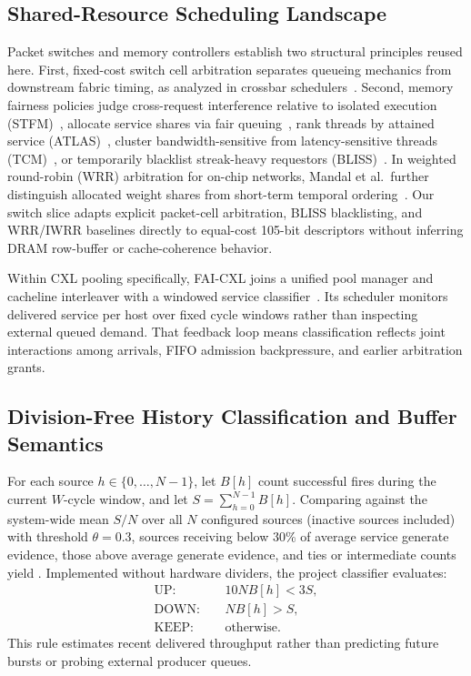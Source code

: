 \subsection{Shared-Resource Scheduling Landscape}
Packet switches and memory controllers establish two structural principles reused here. First, fixed-cost switch cell arbitration separates queueing mechanics from downstream fabric timing, as analyzed in crossbar schedulers~\cite{gupta}. Second, memory fairness policies judge cross-request interference relative to isolated execution (STFM)~\cite{stfm}, allocate service shares via fair queuing~\cite{fqmem}, rank threads by attained service (ATLAS)~\cite{atlas}, cluster bandwidth-sensitive from latency-sensitive threads (TCM)~\cite{tcm}, or temporarily blacklist streak-heavy requestors (BLISS)~\cite{bliss}. In weighted round-robin (WRR) arbitration for on-chip networks, Mandal et al.\ further distinguish allocated weight shares from short-term temporal ordering~\cite{wrr_mandal}. Our switch slice adapts explicit packet-cell arbitration, BLISS blacklisting, and WRR/IWRR baselines directly to equal-cost 105-bit descriptors without inferring DRAM row-buffer or cache-coherence behavior.

Within CXL pooling specifically, FAI-CXL joins a unified pool manager and cacheline interleaver with a windowed service classifier~\cite{fai}. Its scheduler monitors delivered service per host over fixed cycle windows rather than inspecting external queued demand. That feedback loop means classification reflects joint interactions among arrivals, FIFO admission backpressure, and earlier arbitration grants.

\subsection{Division-Free History Classification and Buffer Semantics}
For each source $h\in\{0,\dots,N-1\}$, let $B[h]$ count successful fires during the current $W$-cycle window, and let $S=\sum_{h=0}^{N-1} B[h]$. Comparing against the system-wide mean $S/N$ over all $N$ configured sources (inactive sources included) with threshold $\theta=0.3$, sources receiving below 30\% of average service generate  evidence, those above average generate  evidence, and ties or intermediate counts yield . Implemented without hardware dividers, the project classifier evaluates:
\begin{align}
\mathrm{UP}:&\quad 10NB[h]<3S,\nonumber\\
\mathrm{DOWN}:&\quad NB[h]>S,\label{eq:class-v3}\\
\mathrm{KEEP}:&\quad\text{otherwise}.\nonumber
\end{align}
This rule estimates recent delivered throughput rather than predicting future bursts or probing external producer queues.

